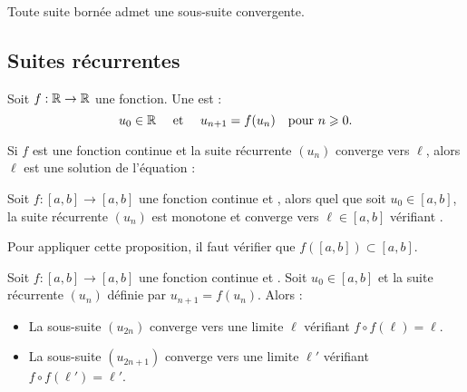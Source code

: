\documentclass[10pt,class=article,crop=false]{standalone}
\begin{document}
\begin{multicols}{2}
\begin{theoreme}
	\label{thm:Bolzano_Weierstrass}
	Toute suite bornée admet une sous-suite convergente.
\end{theoreme}



\subsection{Suites récurrentes}


Soit $f : \mathbb{R} \to \mathbb{R}$ une fonction. Une  
est :
$$u_0 \in \mathbb{R} \quad \text{ et } \quad u_{n+1} = f(u_n) \ \ \text{ pour } n \geqslant 0.$$

\begin{proposition}
	\label{prop:fll}
	Si $f$ est une fonction continue et la suite récurrente $(u_n)$ converge vers $\ell$, alors
	$\ell$ est une solution de l'équation :
\end{proposition}


\begin{proposition}
	\label{prop:fcroissante}
	Soit $f : [a,b] \to [a,b]$ une fonction continue et ,
	alors quel que soit $u_0 \in [a,b]$, la suite récurrente $(u_n)$ est
	monotone et converge vers $\ell \in [a,b]$ vérifiant .
\end{proposition}

Pour appliquer cette proposition, il faut vérifier que $f([a,b]) \subset [a,b]$.


\begin{proposition}
	Soit $f : [a,b] \to [a,b]$ une fonction continue et .
	Soit $u_0 \in [a,b]$ et la suite récurrente $(u_n)$ définie par $u_{n+1}=f(u_n)$. Alors :
	\begin{itemize}
		\item La sous-suite $(u_{2n})$ converge vers une limite $\ell$  vérifiant $f\circ f(\ell)=\ell$.
		\item La sous-suite $(u_{2n+1})$ converge vers une limite $\ell'$ vérifiant $f\circ f(\ell')=\ell'$.
	\end{itemize}
\end{proposition}




\end{multicols}
\end{document}
